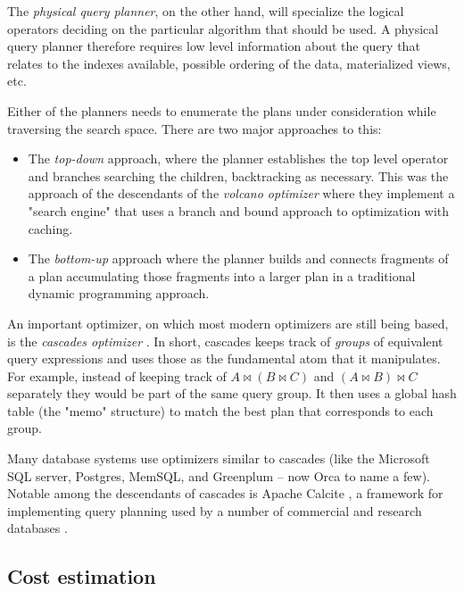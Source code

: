 The \emph{physical query planner}, on the other hand, will specialize
the logical operators deciding on the particular algorithm that should
be used. A physical query planner therefore requires low level
information about the query that relates to the indexes available,
possible ordering of the data, materialized views, etc.

Either of the planners needs to enumerate the plans under
consideration while traversing the search space. There are two major
approaches to this:

\begin{itemize}
\item The \emph{top-down} approach, where the planner establishes the
  top level operator and branches searching the children, backtracking
  as necessary. This was the approach of the descendants of the
  \emph{volcano optimizer} \cite{graefeVolcanoOptimizerGenerator1993a}
  where they implement a "search engine" that uses a branch and bound
  approach to optimization with caching.
\item The \emph{bottom-up} approach where the planner builds and
  connects fragments of a plan accumulating those fragments into a
  larger plan in a traditional dynamic programming approach.
  \cite{raasveldtDuckdbEmbeddableAnalytical2019,kemperHyPerHybridOLTP2011}
\end{itemize}

An important optimizer, on which most modern optimizers are still
being based, is the \emph{cascades optimizer}
\cite{graefeCascadesFrameworkQuery1995}. In short, cascades keeps
track of \emph{groups} of equivalent query expressions and uses those
as the fundamental atom that it manipulates. For example, instead of
keeping track of \(A \Join (B \Join C)\) and \((A \Join B) \Join C\)
separately they would be part of the same query group. It then uses a
global hash table (the "memo" structure) to match the best plan that
corresponds to each group.

Many database systems use optimizers similar to cascades (like the
Microsoft SQL server, Postgres,
MemSQL\cite{chenMemSQLQueryOptimizer2016}, and Greenplum -- now Orca
\cite{solimanOrcaModularQuery2014a} to name a few). Notable among the
descendants of cascades is Apache Calcite
\cite{begoliApacheCalciteFoundational2018}, a framework for
implementing query planning used by a number of commercial and
research databases \cite{nunesalonsoBuildingPolyglotData2020}.

\subsection{Cost estimation}

